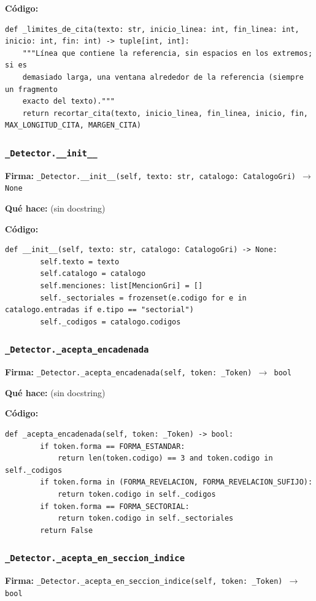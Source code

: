 \documentclass[11pt,a4paper]{article}
\begin{document}
\textbf{Código:}
\begin{lstlisting}
def _limites_de_cita(texto: str, inicio_linea: int, fin_linea: int, inicio: int, fin: int) -> tuple[int, int]:
    """Línea que contiene la referencia, sin espacios en los extremos; si es
    demasiado larga, una ventana alrededor de la referencia (siempre un fragmento
    exacto del texto)."""
    return recortar_cita(texto, inicio_linea, fin_linea, inicio, fin, MAX_LONGITUD_CITA, MARGEN_CITA)
\end{lstlisting}

\subsubsection*{\texttt{\_Detector.\_\_init\_\_}}
\textbf{Firma:} \texttt{\_Detector.\_\_init\_\_(self, texto: str, catalogo: CatalogoGri) $\rightarrow$ None}

\textbf{Qué hace:} (sin docstring)

\textbf{Código:}
\begin{lstlisting}
def __init__(self, texto: str, catalogo: CatalogoGri) -> None:
        self.texto = texto
        self.catalogo = catalogo
        self.menciones: list[MencionGri] = []
        self._sectoriales = frozenset(e.codigo for e in catalogo.entradas if e.tipo == "sectorial")
        self._codigos = catalogo.codigos
\end{lstlisting}

\subsubsection*{\texttt{\_Detector.\_acepta\_encadenada}}
\textbf{Firma:} \texttt{\_Detector.\_acepta\_encadenada(self, token: \_Token) $\rightarrow$ bool}

\textbf{Qué hace:} (sin docstring)

\textbf{Código:}
\begin{lstlisting}
def _acepta_encadenada(self, token: _Token) -> bool:
        if token.forma == FORMA_ESTANDAR:
            return len(token.codigo) == 3 and token.codigo in self._codigos
        if token.forma in (FORMA_REVELACION, FORMA_REVELACION_SUFIJO):
            return token.codigo in self._codigos
        if token.forma == FORMA_SECTORIAL:
            return token.codigo in self._sectoriales
        return False
\end{lstlisting}

\subsubsection*{\texttt{\_Detector.\_acepta\_en\_seccion\_indice}}
\textbf{Firma:} \texttt{\_Detector.\_acepta\_en\_seccion\_indice(self, token: \_Token) $\rightarrow$ bool}
\end{document}
